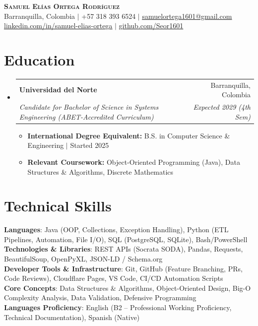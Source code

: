 \documentclass[letterpaper,10.8pt]{article}
\makeatletter
\newcommand{\resumeItem}[1]{
  \item\small{
    {#1 \vspace{-2pt}}
  }
}
\newcommand{\resumeSubheading}[4]{
  \vspace{-2pt}\item
    \begin{tabular*}{\textwidth}[t]{l@{\extracolsep{\fill}}r}
      \textbf{#1} & #2 \\
      \textit{\small#3} & \textit{\small #4} \\
    \end{tabular*}\vspace{-5pt}
}
\newcommand{\resumeSubHeadingListStart}{\begin{itemize}[leftmargin=0.15in, label={}]}
\newcommand{\resumeSubHeadingListEnd}{\end{itemize}}
\newcommand{\resumeItemListStart}{\begin{itemize}[leftmargin=0.15in]}
\newcommand{\resumeItemListEnd}{\end{itemize}\vspace{-4pt}}
\makeatother
\begin{document}
\begin{center}
    \textbf{\Huge \scshape Samuel Elías Ortega Rodríguez} \\ \vspace{2pt}
    \small Barranquilla, Colombia $|$ +57 318 393 6524 $|$ 
    \href{mailto:samuelortega1601@gmail.com}{\underline{samuelortega1601@gmail.com}} \\ \vspace{2pt}
    \href{https://linkedin.com/in/samuel-elias-ortega}{\underline{linkedin.com/in/samuel-elias-ortega}} $|$ 
    \href{https://github.com/Seor1601}{\underline{github.com/Seor1601}}
\end{center}

\section{Education}
  \resumeSubHeadingListStart
    \resumeSubheading
      {Universidad del Norte}{Barranquilla, Colombia}
      {Candidate for Bachelor of Science in Systems Engineering (ABET-Accredited Curriculum)}{Expected 2029 (4th Sem)}
      \resumeItemListStart
        \resumeItem{\textbf{International Degree Equivalent:} B.S. in Computer Science \& Engineering $|$ Started 2025}
        \resumeItem{\textbf{Relevant Coursework:} Object-Oriented Programming (Java), Data Structures \& Algorithms, Discrete Mathematics}
      \resumeItemListEnd
  \resumeSubHeadingListEnd

\section{Technical Skills}
 \begin{itemize}[leftmargin=0.15in, label={}]
    \small{\item{
     \textbf{Languages}{: Java (OOP, Collections, Exception Handling), Python (ETL Pipelines, Automation, File I/O), SQL (PostgreSQL, SQLite), Bash/PowerShell} \\
     \textbf{Technologies \& Libraries}{: REST APIs (Socrata SODA), Pandas, Requests, BeautifulSoup, OpenPyXL, JSON-LD / Schema.org} \\
     \textbf{Developer Tools \& Infrastructure}{: Git, GitHub (Feature Branching, PRs, Code Reviews), Cloudflare Pages, VS Code, CI/CD Automation Scripts} \\
     \textbf{Core Concepts}{: Data Structures \& Algorithms, Object-Oriented Design, Big-O Complexity Analysis, Data Validation, Defensive Programming} \\
     \textbf{Languages Proficiency}{: English (B2 -- Professional Working Proficiency, Technical Documentation), Spanish (Native)}
    }}
 \end{itemize}
 \vspace{-8pt}
\end{document}

